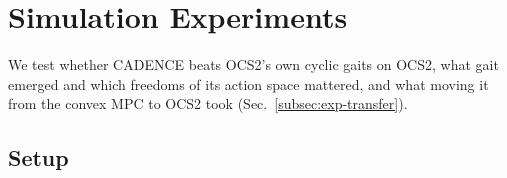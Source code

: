 
\section{Simulation Experiments}
\label{sec:experiments}

 We test whether CADENCE beats OCS2's own cyclic gaits on
OCS2, what gait emerged and which freedoms of its action space
mattered, and what moving it from the convex MPC to OCS2 took
(Sec.~\ref{subsec:exp-transfer}).

\subsection{Setup}
\label{subsec:exp-setup}

